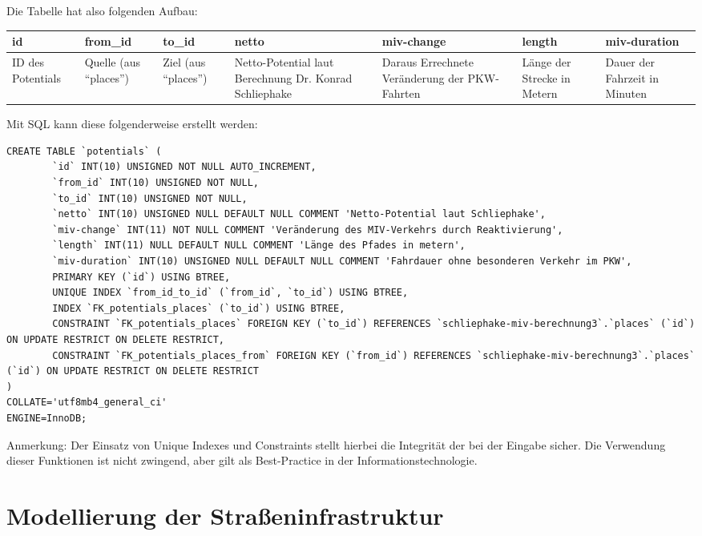 \documentclass[fontsize=12pt,a4paper]{scrreprt}
\begin{document}
Die Tabelle hat also folgenden Aufbau:
\newline
\newline
\begin{tabular}[h]{|l|l|l|l|l|l|l|}
        \hline
        id & from_id & to_id & netto & miv-change & length & miv-duration\\
        \hline
        ID des Potentials & Quelle (aus \enquote{places}) & Ziel (aus \enquote{places}) & Netto-Potential laut Berechnung Dr. Konrad Schliephake & Daraus Errechnete Veränderung der PKW-Fahrten & Länge der Strecke in Metern & Dauer der Fahrzeit in Minuten \\
        \hline
\end{tabular}
\newline
\newline
\newline
Mit SQL kann diese folgenderweise erstellt werden:
\begin{verbatim}
CREATE TABLE `potentials` (
        `id` INT(10) UNSIGNED NOT NULL AUTO_INCREMENT,
        `from_id` INT(10) UNSIGNED NOT NULL,
        `to_id` INT(10) UNSIGNED NOT NULL,
        `netto` INT(10) UNSIGNED NULL DEFAULT NULL COMMENT 'Netto-Potential laut Schliephake',
        `miv-change` INT(11) NOT NULL COMMENT 'Veränderung des MIV-Verkehrs durch Reaktivierung',
        `length` INT(11) NULL DEFAULT NULL COMMENT 'Länge des Pfades in metern',
        `miv-duration` INT(10) UNSIGNED NULL DEFAULT NULL COMMENT 'Fahrdauer ohne besonderen Verkehr im PKW',
        PRIMARY KEY (`id`) USING BTREE,
        UNIQUE INDEX `from_id_to_id` (`from_id`, `to_id`) USING BTREE,
        INDEX `FK_potentials_places` (`to_id`) USING BTREE,
        CONSTRAINT `FK_potentials_places` FOREIGN KEY (`to_id`) REFERENCES `schliephake-miv-berechnung3`.`places` (`id`) ON UPDATE RESTRICT ON DELETE RESTRICT,
        CONSTRAINT `FK_potentials_places_from` FOREIGN KEY (`from_id`) REFERENCES `schliephake-miv-berechnung3`.`places` (`id`) ON UPDATE RESTRICT ON DELETE RESTRICT
)
COLLATE='utf8mb4_general_ci'
ENGINE=InnoDB;        
\end{verbatim}

Anmerkung: Der Einsatz von Unique Indexes und Constraints stellt hierbei die Integrität der bei der Eingabe sicher. Die Verwendung dieser Funktionen ist nicht zwingend, aber gilt als Best-Practice in der Informationstechnologie.

\section{Modellierung der Straßeninfrastruktur}
\end{document}
